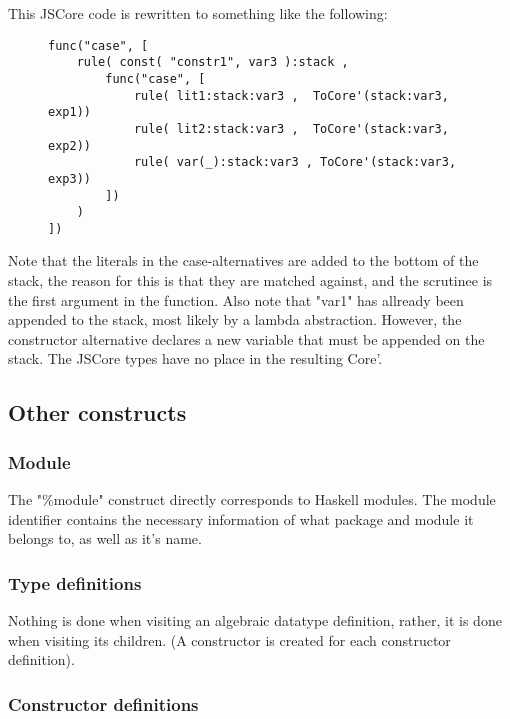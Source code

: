 This JSCore code is rewritten to something like the following:

\begin{figure}[H]
\lstset{ %
language=Haskell,
caption=JSCore case expression in Core',
label=lst:int1
}
\begin{lstlisting}
func("case", [
    rule( const( "constr1", var3 ):stack ,
        func("case", [  
            rule( lit1:stack:var3 ,  ToCore'(stack:var3, exp1))
            rule( lit2:stack:var3 ,  ToCore'(stack:var3, exp2))
            rule( var(_):stack:var3 , ToCore'(stack:var3, exp3))
        ])
    )
])
\end{lstlisting}
\end{figure}

Note that the literals in the case-alternatives are added to the bottom of the stack,
the reason for this is that they are matched against, and the scrutinee is the first
argument in the function.
Also note that "var1" has allready
been appended to the stack, most likely by a lambda abstraction. However, 
the constructor
alternative declares a new variable that must be appended on the stack.
The JSCore types have no place in the resulting Core'.

\subsection*{Other constructs}

\subsubsection*{Module}

The "\%module" construct directly corresponds to Haskell modules. The module identifier
contains the necessary information of what package and module it belongs to, as
well as it's name.

\subsubsection*{Type definitions}

Nothing is done when visiting an algebraic datatype definition, rather, it is done when 
visiting its children. (A constructor is created for each constructor definition).

\subsubsection*{Constructor definitions}

